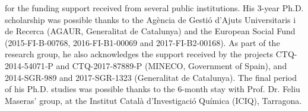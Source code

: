 
 for the funding support received from several public institutions. His 3-year Ph.D. scholarship was possible thanks to the Agència de Gestió d'Ajuts Universitaris i de Recerca (AGAUR, Generalitat de Catalunya) and the European Social Fund (2015-FI-B-00768, 2016-FI-B1-00069 and 2017-FI-B2-00168). As part of the research group, he also acknowledges the support received by the projects CTQ-2014‐54071‐P and CTQ-2017-87889-P (MINECO, Government of Spain), and 2014-SGR-989 and 2017-SGR-1323 (Generalitat de Catalunya). The final period of his Ph.D. studies was possible thanks to the 6-month stay with Prof. Dr. Feliu Maseras' group, at the Institut Català d'Investigació Química (ICIQ), Tarragona.
